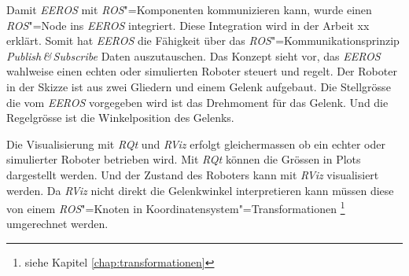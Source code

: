 Damit \textit{EEROS} mit \textit{ROS}"=Komponenten kommunizieren kann, wurde einen \textit{ROS}"=Node ins \textit{EEROS} integriert.
Diese Integration wird in der Arbeit xx erklärt. %
Somit hat \textit{EEROS} die Fähigkeit über das \textit{ROS}"=Kommunikationsprinzip \textit{Publish\,\&\,Subscribe} Daten auszutauschen.
Das Konzept sieht vor, das \textit{EEROS} wahlweise einen echten oder simulierten Roboter steuert und regelt.
Der Roboter in der Skizze ist aus zwei Gliedern und einem Gelenk aufgebaut.
Die Stellgrösse die vom \textit{EEROS} vorgegeben wird ist das Drehmoment für das Gelenk.
Und die Regelgrösse ist die Winkelposition des Gelenks.

Die Visualisierung mit \textit{RQt} und \textit{RViz} erfolgt gleichermassen ob ein echter oder simulierter Roboter betrieben wird.
Mit \textit{RQt} können die Grössen in Plots dargestellt werden.
Und der Zustand des Roboters kann mit \textit{RViz} visualisiert werden.
Da \textit{RViz} nicht direkt die Gelenkwinkel interpretieren kann müssen diese von einem \textit{ROS}"=Knoten in Koordinatensystem"=Transformationen \footnote{siehe Kapitel \ref{chap:transformationen}} umgerechnet werden.






